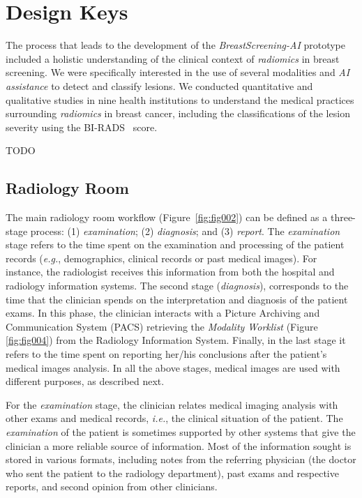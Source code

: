 \section{Design Keys}
\label{sec:environment}

The process that leads to the development of the {\it BreastScreening-AI} prototype~\cite{https://doi.org/10.13140/rg.2.2.29816.70409} included a holistic understanding of the clinical context of {\it radiomics} in breast screening.
We were specifically interested in the use of several modalities and {\it AI assistance} to detect and classify lesions.
We conducted quantitative and qualitative studies in nine health institutions to understand the medical practices surrounding {\it radiomics} in breast cancer, including the classifications of the lesion severity using the BI-RADS~\cite{https://doi.org/10.13140/rg.2.2.36306.86725} score.

TODO

\clearpage

\subsection{Radiology Room}

The main radiology room workflow (Figure~\ref{fig:fig002}) can be defined as a three-stage process:
(1) {\it examination};
(2) {\it diagnosis}; and
(3) {\it report}.
The {\it examination} stage refers to the time spent on the examination and processing of the patient records ({\it e.g.}, demographics, clinical records or past medical images).
For instance, the radiologist receives this information from both the hospital and radiology information systems.
The second stage ({\it diagnosis}), corresponds to the time that the clinician spends on the interpretation and diagnosis of the patient exams.
In this phase, the clinician interacts with a Picture Archiving and Communication System (PACS) retrieving the {\it Modality Worklist} (Figure \ref{fig:fig004}) from the Radiology Information System.
Finally, in the last stage it refers to the time spent on reporting her/his conclusions after the patient's medical images analysis.
In all the above stages, medical images are used with different purposes, as described next.

For the {\it examination} stage, the clinician relates medical imaging analysis with other exams and medical records, {\em i.e.}, the clinical situation of the patient.
The {\it examination} of the patient is sometimes supported by other systems that give the clinician a more reliable source of information.
Most of the information sought is stored in various formats, including notes from the referring physician (the doctor who sent the patient to the radiology department), past exams and respective reports, and second opinion from other clinicians.

